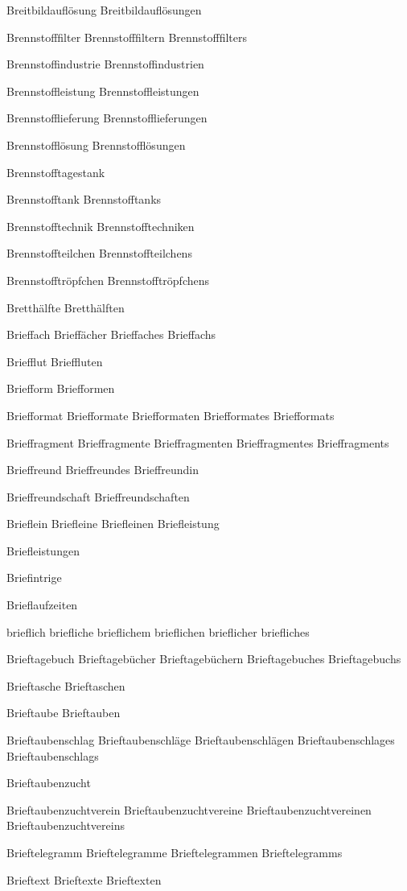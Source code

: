 Breitbildauflösung
Breitbildauflösungen

Brennstofffilter
Brennstofffiltern
Brennstofffilters

Brennstoffindustrie
Brennstoffindustrien

Brennstoffleistung
Brennstoffleistungen

Brennstofflieferung
Brennstofflieferungen

Brennstofflösung
Brennstofflösungen

Brennstofftagestank

Brennstofftank
Brennstofftanks

Brennstofftechnik
Brennstofftechniken

Brennstoffteilchen
Brennstoffteilchens

Brennstofftröpfchen
Brennstofftröpfchens

Bretthälfte
Bretthälften

Brieffach
Brieffächer
Brieffaches
Brieffachs

Briefflut
Brieffluten

Briefform
Briefformen

Briefformat
Briefformate
Briefformaten
Briefformates
Briefformats

Brieffragment
Brieffragmente
Brieffragmenten
Brieffragmentes
Brieffragments

Brieffreund
Brieffreundes
Brieffreundin

Brieffreundschaft
Brieffreundschaften

Brieflein
Briefleine
Briefleinen
Briefleistung

Briefleistungen

Briefintrige

Brieflaufzeiten

brieflich
briefliche
brieflichem
brieflichen
brieflicher
briefliches

Brieftagebuch
Brieftagebücher
Brieftagebüchern
Brieftagebuches
Brieftagebuchs

Brieftasche
Brieftaschen

Brieftaube
Brieftauben

Brieftaubenschlag
Brieftaubenschläge
Brieftaubenschlägen
Brieftaubenschlages
Brieftaubenschlags

Brieftaubenzucht

Brieftaubenzuchtverein
Brieftaubenzuchtvereine
Brieftaubenzuchtvereinen
Brieftaubenzuchtvereins

Brieftelegramm
Brieftelegramme
Brieftelegrammen
Brieftelegramms

Brieftext
Brieftexte
Brieftexten

